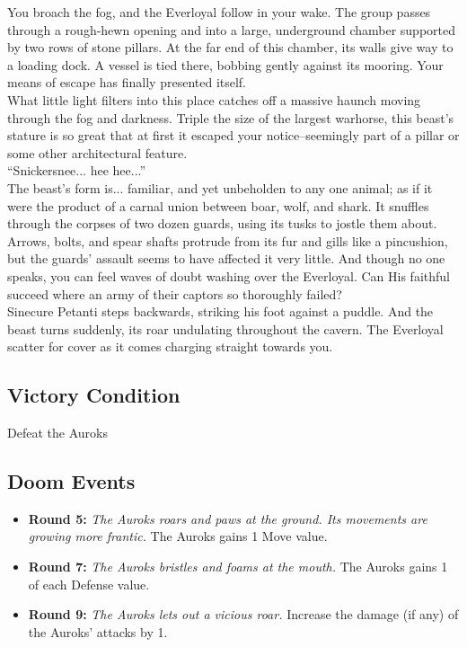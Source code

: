 You broach the fog, and the Everloyal follow in your wake. The group passes through a rough-hewn opening and into a large, underground chamber supported by two rows of stone pillars. At the far end of this chamber, its walls give way to a loading dock. A vessel is tied there, bobbing gently against its mooring. Your means of escape has finally presented itself.\\

What little light filters into this place catches off a massive haunch moving through the fog and darkness. Triple the size of the largest warhorse, this beast’s stature is so great that at first it escaped your notice--seemingly part of a pillar or some other architectural feature.\\

“Snickersnee... hee hee...”\\

The beast's form is... familiar, and yet unbeholden to any one animal; as if it were the product of a carnal union between boar, wolf, and shark. It snuffles through the corpses of two dozen guards, using its tusks to jostle them about. Arrows, bolts, and spear shafts protrude from its fur and gills like a pincushion, but the guards’ assault seems to have affected it very little. And though no one speaks, you can feel waves of doubt washing over the Everloyal. Can His faithful succeed where an army of their captors so thoroughly failed?\\

Sinecure Petanti steps backwards, striking his foot against a puddle. And the beast turns suddenly, its roar undulating throughout the cavern. The Everloyal scatter for cover as it comes charging straight towards you.

\subsection*{Victory Condition}
Defeat the Auroks

\subsection*{Doom Events}
\begin{itemize}
\item \textbf{Round 5:} \emph{The Auroks roars and paws at the ground. Its movements are growing more frantic.} The Auroks gains 1 Move value.
\item \textbf{Round 7:} \emph{The Auroks bristles and foams at the mouth.} The Auroks gains 1 of each Defense value.
\item \textbf{Round 9:} \emph{The Auroks lets out a vicious roar.} Increase the damage (if any) of the Auroks’ attacks by 1.
\end{itemize}

